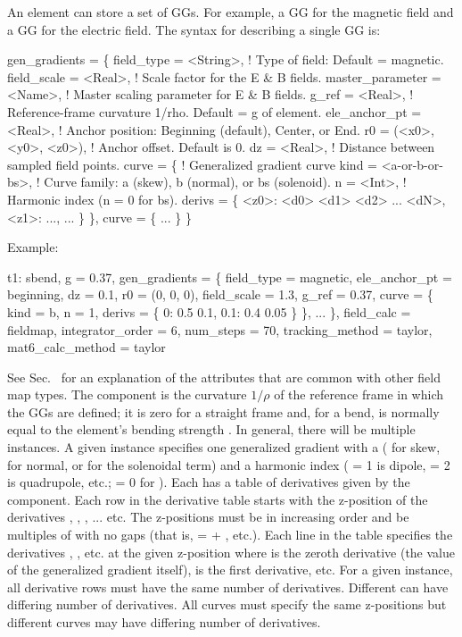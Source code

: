 An element can store a set of GGs. For example, a GG for the magnetic field and a GG for the
electric field. The syntax for describing a single GG is:
\begin{example}
  gen_gradients = \{
    field_type       = <String>,    ! Type of field: Default = magnetic.
    field_scale      = <Real>,      ! Scale factor for the E & B fields.
    master_parameter = <Name>,      ! Master scaling parameter for E & B fields.
    g_ref            = <Real>,      ! Reference-frame curvature 1/rho. Default = g of element.
    ele_anchor_pt    = <Real>,      ! Anchor position: Beginning (default), Center, or End.
    r0               = (<x0>, <y0>, <z0>), ! Anchor offset. Default is 0.
    dz               = <Real>,             ! Distance between sampled field points.
    curve = \{                      ! Generalized gradient curve
      kind = <a-or-b-or-bs>,        ! Curve family: a (skew), b (normal), or bs (solenoid).
      n = <Int>,                    ! Harmonic index (n = 0 for bs).
      derivs = \{
        <z0>: <d0> <d1> <d2> ... <dN>,
        <z1>: ...,
        ...
      \}
    \},
    curve = \{
      ...
    \}
  \}
\end{example}

Example:
\begin{example}
  t1: sbend, g = 0.37, gen_gradients = \{
    field_type = magnetic,   ele_anchor_pt = beginning,
    dz = 0.1,                r0 = (0, 0, 0),
    field_scale = 1.3,       g_ref = 0.37,
    curve = \{ kind = b, n = 1, derivs = \{ 0: 0.5 0.1, 0.1: 0.4 0.05 \} \},
    ...  \}, field_calc = fieldmap, integrator_order = 6, num_steps = 70,
  tracking_method = taylor, mat6_calc_method = taylor
\end{example}

See Sec.~ for an explanation of the attributes that are common with other field
map types. The  component is the curvature $1/\rho$ of the reference frame in which the GGs
are defined; it is zero for a straight frame and, for a bend, is normally equal to the element's
bending strength . In general, there will be multiple  instances.  A given 
instance specifies one generalized gradient with a  ( for skew,  for normal, or
 for the solenoidal term) and a harmonic index  ( = 1 is dipole,  = 2 is
quadrupole, etc.;  = 0 for ). Each  has a table of derivatives given by the
 component. Each row in the derivative table starts with the z-position of the derivatives
, , , ... etc. The z-positions must be in increasing order and be multiples
of  with no gaps (that is,  =  + , etc.). Each line in the 
table specifies the derivatives , , etc. at the given z-position where  is
the zeroth derivative (the value of the generalized gradient itself),  is the first
derivative, etc. For a given  instance, all derivative rows must have the same number of
derivatives. Different  can have differing number of derivatives. All curves must specify
the same z-positions but different curves may have differing number of derivatives.

